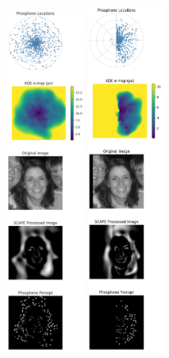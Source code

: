 \begin{figure}[ht!]
    \centering
    \includegraphics[width=0.23\textwidth]{figures/implant schemes/1024default.png}
    \includegraphics[width=0.223\textwidth]{figures/implant schemes/neuralink.png}

\end{figure}
